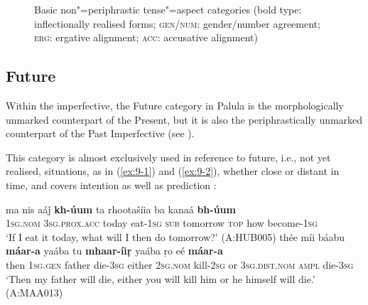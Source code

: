 \begin{figure}[ht]
\centering
{}
\caption{Basic non"=periphrastic tense"=aspect categories (bold type: inflectionally realised forms;
    \textsc{gen/num}: gender/number agreement; \textsc{erg}: ergative alignment; \textsc{acc}:
    accusative alignment)}
\label{fig:9-1}
\end{figure}

\subsection{Future}
\label{subsec:9-1-2}

\largerpage
Within the imperfective, the Future category in Palula is the morphologically unmarked counterpart of the Present, but it is also the periphrastically unmarked counterpart of the Past Imperfective (see ). 



This category is almost exclusively used in reference to future, i.e., not yet realised, situations, as in (\ref{ex:9-1}) and (\ref{ex:9-2}), whether close or distant in time, and covers intention as well as prediction \citep[105--108]{dahl1985}:


\begin{exe}
\ex
\label{ex:9-1}
\gll ma nis aáǰ \textbf{kh-úum} ta rhootašíia ba kanaá \textbf{bh-úum}\\
\textsc{1sg.nom} \textsc{3}\textsc{sg.prox.acc} today eat-\textsc{1sg} \textsc{sub} tomorrow \textsc{top} how become-\textsc{1sg}\\
\glt `If I eat it today, what will I then do tomorrow?' (A:HUB005)
\ex
\label{ex:9-2}
\gll thée míi báabu \textbf{máar-a} yaába tu \textbf{mhaar-íiṛ} yaába ṛo eé \textbf{máar-a} \\
then \textsc{1sg.gen} father die-\textsc{3sg} either \textsc{2sg.nom} kill-\textsc{2sg}  or \textsc{3sg.dist.nom} \textsc{ampl} die-\textsc{3sg}  \\
\glt `Then my father will die, either you will kill him or he himself will die.' (A:MAA013)
\end{exe}

